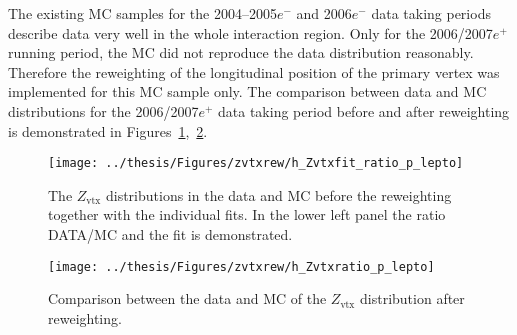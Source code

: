 The existing MC samples for the 2004--2005$e^-$ and 2006$e^-$ data taking periods describe data very well in the whole interaction region. Only for the 2006/2007$e^+$ running period, the MC did not reproduce the data distribution reasonably. Therefore the reweighting of the longitudinal position of the primary vertex was implemented for this MC sample only. The comparison between data and MC distributions for the 2006/2007$e^+$ data taking period before and after reweighting is demonstrated in Figures~\ref{fig:zvtxrew},~\ref{fig:zvtxrewaf}.
\begin{figure}[t]
\begin{center}
 \hspace{-35pt}\texttt{[image: ../thesis/Figures/zvtxrew/h\_Zvtxfit\_ratio\_p\_lepto]}%
\end{center}
\caption{The $Z_\text{vtx}$ distributions in the data and \lepto MC before the reweighting together with the individual fits. In the lower left panel the ratio DATA/MC and the fit is demonstrated.} 
\label{fig:zvtxrew}
\end{figure}

\begin{figure}[p]
\begin{center}
 \texttt{[image: ../thesis/Figures/zvtxrew/h\_Zvtxratio\_p\_lepto]}
\end{center}
\caption{Comparison between the data and \lepto MC of the $Z_\text{vtx}$ distribution after reweighting.} 
\label{fig:zvtxrewaf}
\end{figure}